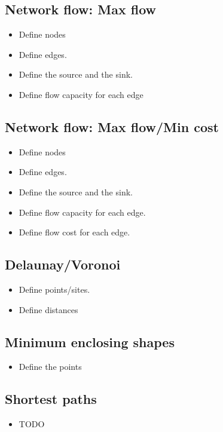 \documentclass[guide.tex]{subfiles}
\begin{document}
\subsection{Network flow: Max flow}
\begin{itemize}
  \item Define nodes
  \item Define edges.
  \item Define the source and the sink.
  \item Define flow capacity for each edge
\end{itemize}

\subsection{Network flow: Max flow/Min cost}
\begin{itemize}
  \item Define nodes
  \item Define edges.
  \item Define the source and the sink.
  \item Define flow capacity for each edge.
  \item Define flow cost for each edge.
\end{itemize}


\subsection{Delaunay/Voronoi}
\begin{itemize}
  \item Define points/sites.
  \item Define distances
\end{itemize}

\subsection{Minimum enclosing shapes}
\begin{itemize}
  \item Define the points
\end{itemize}


\subsection{Shortest paths}
\begin{itemize}
  \item TODO
\end{itemize}
\end{document}
